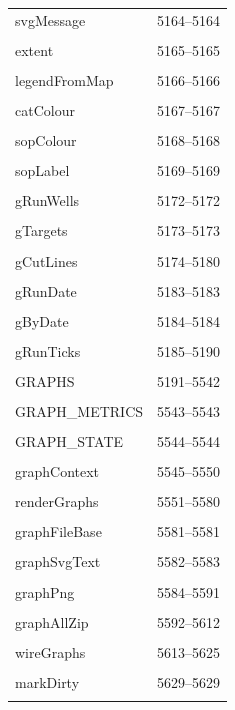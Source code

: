 {\begin{longtable}{@{}p{11cm}r@{}}
svgMessage & 5164--5164 \\\\\hline
extent & 5165--5165 \\\\\hline
legendFromMap & 5166--5166 \\\\\hline
catColour & 5167--5167 \\\\\hline
sopColour & 5168--5168 \\\\\hline
sopLabel & 5169--5169 \\\\\hline
gRunWells & 5172--5172 \\\\\hline
gTargets & 5173--5173 \\\\\hline
gCutLines & 5174--5180 \\\\\hline
gRunDate & 5183--5183 \\\\\hline
gByDate & 5184--5184 \\\\\hline
gRunTicks & 5185--5190 \\\\\hline
GRAPHS & 5191--5542 \\\\\hline
GRAPH\_METRICS & 5543--5543 \\\\\hline
GRAPH\_STATE & 5544--5544 \\\\\hline
graphContext & 5545--5550 \\\\\hline
renderGraphs & 5551--5580 \\\\\hline
graphFileBase & 5581--5581 \\\\\hline
graphSvgText & 5582--5583 \\\\\hline
graphPng & 5584--5591 \\\\\hline
graphAllZip & 5592--5612 \\\\\hline
wireGraphs & 5613--5625 \\\\\hline
markDirty & 5629--5629 \\\\\hline

\end{longtable}}
